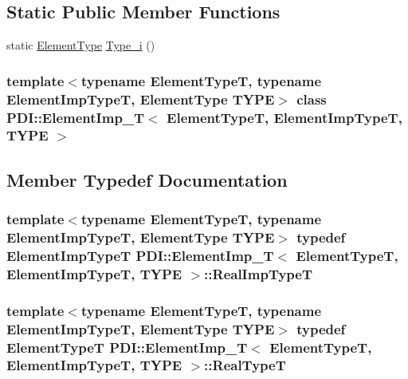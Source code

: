 \subsection*{Static Public Member Functions}
\begin{CompactItemize}
\item 
static \hyperlink{namespace_p_d_i_bbd28c6f8905ff6834d6f84ba4363e5e}{ElementType} \hyperlink{class_p_d_i_1_1_element_imp___t_2396ace1aa37ed1275db4e5b6983e1e3}{Type\_\-i} ()
\end{CompactItemize}
\subsubsection*{template$<$typename ElementTypeT, typename ElementImpTypeT, ElementType TYPE$>$ class PDI::ElementImp\_\-T$<$ ElementTypeT, ElementImpTypeT, TYPE $>$}



\subsection{Member Typedef Documentation}
\hypertarget{class_p_d_i_1_1_element_imp___t_d8693ec6dc2ab357299fd989b0ac532d}{
\subsubsection[{RealImpTypeT}]{\setlength{\rightskip}{0pt plus 5cm}template$<$typename ElementTypeT, typename ElementImpTypeT, ElementType TYPE$>$ typedef ElementImpTypeT {\bf PDI::ElementImp\_\-T}$<$ ElementTypeT, ElementImpTypeT, TYPE $>$::{\bf RealImpTypeT}}}
\label{class_p_d_i_1_1_element_imp___t_d8693ec6dc2ab357299fd989b0ac532d}


\hypertarget{class_p_d_i_1_1_element_imp___t_3db9ff9c897057a35a0652bf5045488e}{
\subsubsection[{RealTypeT}]{\setlength{\rightskip}{0pt plus 5cm}template$<$typename ElementTypeT, typename ElementImpTypeT, ElementType TYPE$>$ typedef ElementTypeT {\bf PDI::ElementImp\_\-T}$<$ ElementTypeT, ElementImpTypeT, TYPE $>$::{\bf RealTypeT}}}
\label{class_p_d_i_1_1_element_imp___t_3db9ff9c897057a35a0652bf5045488e}




